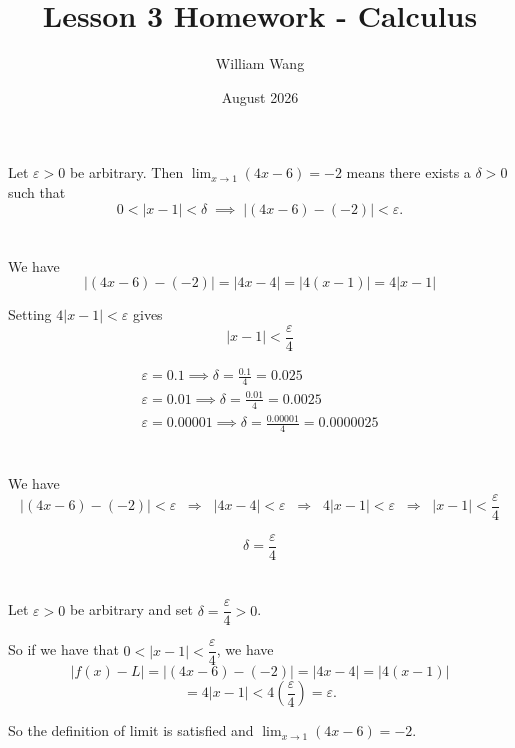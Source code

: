 \documentclass{article}
\title{Lesson 3 Homework - Calculus}
\author{William Wang}
\date{August 2026}
\begin{document}
\maketitle

\section{}
Let $\varepsilon>0$ be arbitrary. Then $\displaystyle\lim_{x\to 1}(4x-6)=-2$ means
there exists a $\delta>0$ such that
\[
0<|x-1|<\delta \;\implies\; |(4x-6)-(-2)|<\varepsilon.
\]
\section{}
We have
\[
|(4x-6)-(-2)| = |4x-4| = |4(x-1)| = 4|x-1|
\]

Setting $4|x-1| < \varepsilon$ gives
\[
|x-1| < \frac{\varepsilon}{4}
\]

\begin{align*}
\varepsilon = 0.1 \implies \delta = \frac{0.1}{4} = 0.025 \\
\varepsilon = 0.01 \implies \delta = \frac{0.01}{4} = 0.0025 \\
\varepsilon = 0.00001 \implies \delta = \frac{0.00001}{4} = 0.0000025
\end{align*}
\section{}
We have
\[
|(4x-6)-(-2)| < \varepsilon
\;\;\Longrightarrow\;\;
|4x-4| < \varepsilon
\;\;\Longrightarrow\;\;
4|x-1| < \varepsilon
\;\;\Longrightarrow\;\;
|x-1| < \frac{\varepsilon}{4}
\]

\[
\delta = \dfrac{\varepsilon}{4}
\]

\section{}
 Let $\varepsilon>0$ be arbitrary and set $\delta = \dfrac{\varepsilon}{4} > 0$.

So if we have that $0<|x-1|<\dfrac{\varepsilon}{4}$, we have
\[
|f(x)-L| = |(4x-6)-(-2)| = |4x-4| = |4(x-1)|
\]
\[
= 4|x-1| < 4\left(\frac{\varepsilon}{4}\right) = \varepsilon.
\]

So the definition of limit is satisfied and $\displaystyle\lim_{x\to 1}(4x-6) = -2$.
\end{document}
